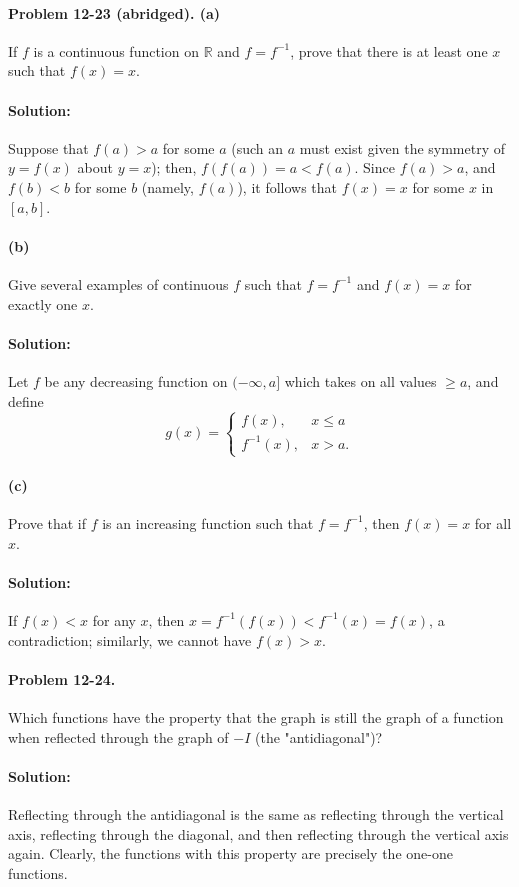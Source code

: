 \documentclass{article}
\begin{document}
\paragraph{Problem 12-23 (abridged). (a)} If $f$ is a continuous function on
$\mathbb{R}$ and $f = f^{-1}$, prove that there is at least one $x$ such that
$f(x) = x$.

\paragraph{Solution:} Suppose that $f(a) > a$ for some $a$ (such an $a$ must
exist given the symmetry of $y = f(x)$ about $y = x$); then, $f(f(a)) = a <
f(a)$. Since $f(a) > a$, and $f(b) < b$ for some $b$ (namely, $f(a)$), it
follows that $f(x) = x$ for some $x$ in $[a, b]$.

\paragraph{(b)} Give several examples of continuous $f$ such that $f = f^{-1}$
and $f(x) = x$ for exactly one $x$.

\paragraph{Solution:} Let $f$ be any decreasing function on $(-\infty, a]$
which takes on all values $\geq a$, and define \begin{equation*}
  g(x) = \begin{cases}
    f(x), &x \leq a \\
    f^{-1}(x), &x > a.
  \end{cases}
\end{equation*}

\paragraph{(c)} Prove that if $f$ is an increasing function such that $f =
f^{-1}$, then $f(x) = x$ for all $x$.

\paragraph{Solution:} If $f(x) < x$ for any $x$, then $x = f^{-1}(f(x)) <
f^{-1}(x) = f(x)$, a contradiction; similarly, we cannot have $f(x) > x$.

\paragraph{Problem 12-24.} Which functions have the property that the graph is
still the graph of a function when reflected through the graph of $-I$ (the
"antidiagonal")?

\paragraph{Solution:} Reflecting through the antidiagonal is the same as
reflecting through the vertical axis, reflecting through the diagonal, and then
reflecting through the vertical axis again. Clearly, the functions with this
property are precisely the one-one functions.
\end{document}
